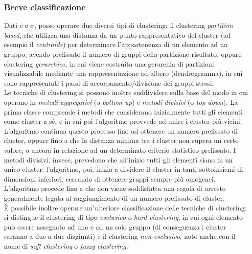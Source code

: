 \documentclass{article}
\begin{document}
	\subsubsection{Breve classificazione}
		Dati $v$ e $\sigma$, posso operare due diversi tipi di clustering: il clustering \textit{partition based}, che utilizza una distanza da un punto rappresentativo del cluster (ad esempio il \textit{centroide}) per determinare l'appartenenza di un elemento ad un gruppo, avendo prefissato il numero di gruppi della partizione risultato, oppure clustering \textit{gerarchico}, in cui viene costruita una gerarchia di partizioni visualizzabile mediante una rappresentazione ad albero (dendrogramma), in cui sono rappresentati i passi di accorpamento/divisione dei gruppi stessi.\\
		Le tecniche di clustering si possono inoltre suddividere sulla base del modo in cui operano in \textit{metodi aggregativi} (o \textit{bottom-up}) e \textit{metodi divisivi} (o \textit{top-down}). La prima classe comprende i metodi che considerano inizialmente tutti gli elementi come cluster a sé, e in cui poi l'algoritmo provvede ad unire i cluster più vicini. L'algoritmo continua questo processo fino ad ottenere un numero prefissato di cluster, oppure fino a che la distanza minima tra i cluster non supera un certo valore, o ancora in relazione ad un determinato criterio statistico prefissato.
		I metodi divisivi, invece, prevedono che all'inizio tutti gli elementi siano in un unico cluster: l'algoritmo, poi, inizia a dividere il cluster in tanti sottoinsiemi di dimensioni inferiori, cercando di ottenere gruppi sempre più omogenei. L'algoritmo procede fino a che non viene soddisfatta una regola di arresto generalmente legata al raggiungimento di un numero prefissato di cluster.\\
		\`E possibile inoltre operare un'ulteriore classificazione delle tecniche di clustering: si distingue il clustering di tipo \textit{esclusivo} o \textit{hard clustering}, in cui ogni elemento può essere assegnato ad uno e ad un solo gruppo (di conseguenza i cluster saranno a due a due disgiunti) e il clustering \textit{non-esclusivo}, noto anche con il nome di \textit{soft clustering} o \textit{fuzzy clustering}.
\end{document}

